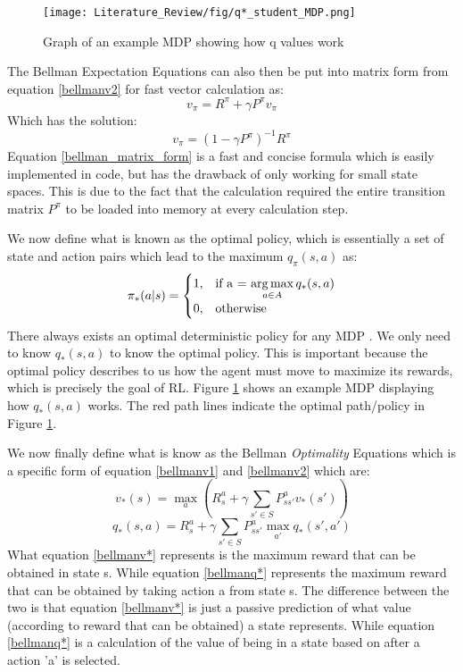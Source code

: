 \begin{figure}[!htb]
	\centering
	\texttt{[image: Literature\_Review/fig/q*\_student\_MDP.png]}
	\caption{Graph of an example MDP showing how q values work\cite{David_Silver}}
	\label{fig:q*}
	\centering
\end{figure}
The Bellman Expectation Equations can also then be put into matrix form from equation \ref{bellmanv2} for fast vector calculation as:
\begin{equation}
	v_\pi = R^{\pi} + \gamma P^{\pi}v_\pi
\end{equation}
Which has the solution:
\begin{equation}
	v_\pi = (1 - \gamma P^{\pi})^{-1}R^{\pi}
	\label{bellman_matrix_form}
\end{equation}
Equation \ref{bellman_matrix_form} is a fast and concise formula which is easily implemented in code, but has the drawback of only working for small state spaces. This is due to the fact that the calculation required the entire transition matrix $P^\pi$ to be loaded into memory at every calculation step.

We now define what is known as the optimal policy, which is essentially a set of state and action pairs which lead to the maximum $q_\pi(s,a)$ as:
\begin{align}
	\pi_{*}(a|s)=\begin{cases}
		1, & \text{if a = $\operatorname*{arg\,max}\limits_{a \in A}q_* (s,a)$}\\
		0, & \text{otherwise}
	\end{cases}
	\label{eq:pi_*}
\end{align}
There always exists an optimal deterministic policy for any MDP \cite{sutton_barto}. We only need to know $q_* (s,a)$ to know the optimal policy. This is important because the optimal policy describes to us how the agent must move to maximize its rewards, which is precisely the goal of RL. Figure \ref{fig:q*} shows an example MDP displaying how $q_* (s,a)$ works. The red path lines indicate the optimal path/policy in Figure \ref{fig:q*}.

We now finally define what is know as the Bellman \textit{Optimality} Equations which is a specific form of equation \ref{bellmanv1} and \ref{bellmanv2} which are:
\begin{equation}
	v_*(s) = \max\limits_{a}(R^{a}_s+\gamma\sum_{s'\in S}P^{a}_{ss'}v_*(s'))
	\label{bellmanv*}
\end{equation}
\begin{equation}
	q_*(s,a) = R^{a}_s +\gamma \sum_{s'\in S}P^{a}_{ss'}\max\limits_{a'}q_*(s',a')
	\label{bellmanq*}
\end{equation}
What equation \ref{bellmanv*} represents is the maximum reward that can be obtained in state s. While equation \ref{bellmanq*} represents the maximum reward that can be obtained by taking action a from state s. The difference between the two is that equation \ref{bellmanv*} is just a passive prediction of what value (according to reward that can be obtained) a state represents. While equation \ref{bellmanq*} is a calculation of the value of being in a state based on after a action 'a' is selected.

